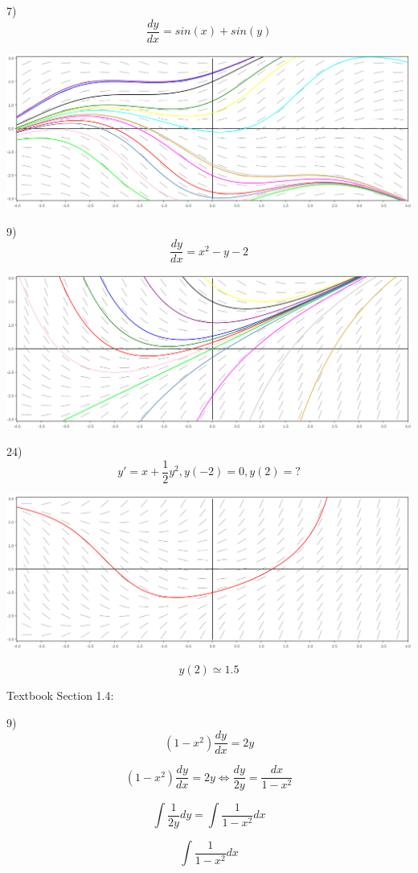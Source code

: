 \documentclass{article}
\begin{document}
7) \[\frac{dy}{dx} = sin(x) + sin(y)\]


\includegraphics[width=\linewidth]{sinx_plus_siny}


9) \[\frac{dy}{dx} = x^2 - y - 2\]

\includegraphics[width=\linewidth]{x_minus_y_plus_1}


24) \[y' = x + \frac{1}{2}y^2, y(-2) = 0, y(2) = ?\]

\includegraphics[width=\linewidth]{x_plus_one_half_y_squared}

\[y(2) \simeq 1.5\]


\hspace{1cm}

Textbook Section 1.4:

9) \[(1-x^2)\frac{dy}{dx} = 2y\]

\[(1-x^2)\frac{dy}{dx} = 2y \iff
\frac{dy}{2y} = \frac{dx}{1-x^2}\]

\[\int \frac{1}{2y}dy = \int \frac{1}{1-x^2}dx\]

\[\int \frac{1}{1-x^2}dx\]
\end{document}
